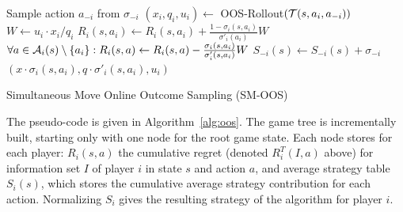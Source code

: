 {\begin{algorithm2e}[t!]
{    Sample action $a_{-i}$ from $\sigma_{-i}$\;
    $(x_i,q_i,u_i) \gets$ OOS-Rollout$(\mathcal{T}(s,a_i,a_{-i}))$\label{alg:oos:rollout}\;
  }
  $W \gets u_i \cdot x_i/q_i$\;  \label{alg:oos:update1}
  $R_i(s,a_i) \gets  R_i(s,a_i) + \frac{1-\sigma_i(s,a_i)}{\sigma'_i(a_i)}W$\;
  $\forall a\in\mathcal{A}_i(s)\setminus\{a_i\}: R_i(s,a) \gets R_i(s,a) - \frac{\sigma_i(s,a_i)}{\sigma'_i(s,a_i)}W$\; \label{alg:oos:update2}
  $S_{-i}(s) \gets S_{-i}(s) + \sigma_{-i}$\; \label{alg:oos:update3}
  \Return $(x\cdot \sigma_i(s,a_i), q\cdot \sigma'_i(s,a_i), u_i)$\; \label{alg:returnend}
  \vspace{0.1cm}
  \caption{Simultaneous Move Online Outcome Sampling (SM-OOS)  \label{alg:oos}}
\end{algorithm2e}

The pseudo-code is given in Algorithm~\ref{alg:oos}. The game tree is incrementally built, starting only with one node for the root game state.
Each node stores for each player: $R_i(s,a)$ the cumulative regret (denoted $R_i^T(I,a)$ above) for information set $I$ of player $i$ in state $s$ and action $a$,
and average strategy table $S_i(s)$, which stores the cumulative average strategy contribution for each action.
Normalizing $S_i$ gives the resulting strategy of the algorithm for player $i$.

}
